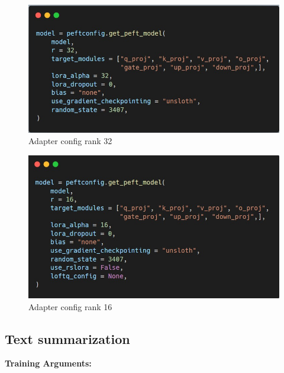\begin{figure}[h!]
	\centering
	\includegraphics[scale=0.5]{figures/Adapter config rank 32.jpeg}
	\caption{ Adapter config rank 32 }
\end{figure}

\begin{figure}[h!]
	\centering
	\includegraphics[scale=0.5]{figures/Adapter config rank 16.jpeg}
	\caption{ Adapter config rank 16 }
\end{figure}

\newpage
\subsection{Text summarization }

\hfill \break
\textbf{Training Arguments:}



